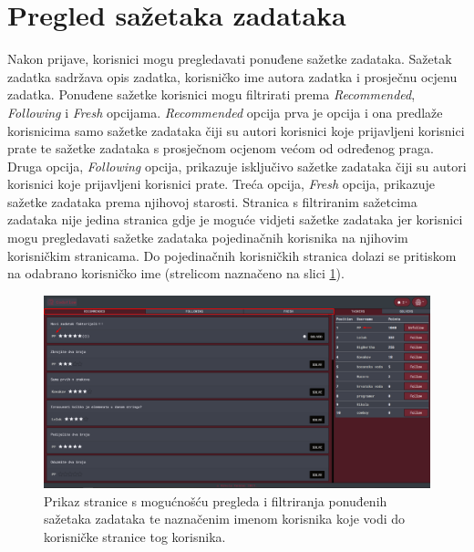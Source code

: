 \documentclass[times, utf8, zavrsni]{fer}
\begin{document}
		\section{Pregled sažetaka zadataka}
		\label{sec:sazetak}
		Nakon prijave, korisnici mogu pregledavati ponuđene sažetke zadataka. Sažetak zadatka sadržava opis zadatka, korisničko ime autora zadatka i prosječnu ocjenu zadatka. Ponuđene sažetke korisnici mogu filtrirati prema \textit{Recommended}, \textit{Following} i  \textit{Fresh} opcijama. \textit{Recommended} opcija prva je opcija i ona predlaže korisnicima samo sažetke zadataka čiji su autori korisnici koje prijavljeni korisnici prate te sažetke zadataka s prosječnom ocjenom većom od određenog praga. Druga opcija, \textit{Following} opcija, prikazuje isključivo sažetke zadataka čiji su autori korisnici koje prijavljeni korisnici prate. Treća opcija, \textit{Fresh} opcija, prikazuje sažetke zadataka prema njihovoj starosti. Stranica s filtriranim sažetcima zadataka nije jedina stranica gdje je moguće vidjeti sažetke zadataka jer korisnici mogu pregledavati sažetke zadataka pojedinačnih korisnika na njihovim korisničkim stranicama. Do pojedinačnih korisničkih stranica dolazi se pritiskom na odabrano korisničko ime (strelicom naznačeno na slici \ref{fig:pregled}).
		\begin{figure}[htb]
			\centering
			\includegraphics[width=\linewidth]{pictures/koristenje/Pregled.png}
			\caption{Prikaz stranice s mogućnošću pregleda i filtriranja ponuđenih sažetaka zadataka te naznačenim imenom korisnika koje vodi do korisničke stranice tog korisnika.}
			\label{fig:pregled}
		\end{figure}
	
\end{document}
